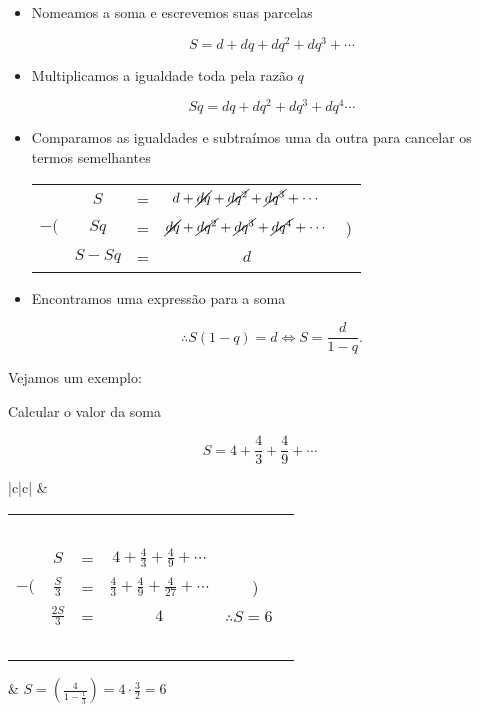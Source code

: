 \begin{itemize}

\item Nomeamos a soma e escrevemos suas parcelas

\[
S=d+dq+dq^2+dq^3+\cdots
\]

\item Multiplicamos a igualdade toda pela razão $q$

\[
Sq=dq+dq^2+dq^3+dq^4\cdots
\]

\item Comparamos as igualdades e subtraímos uma da outra para cancelar os termos semelhantes

\begin{center}
	\begin{tabular}{ccccc}
		\  & $S$ & = & $d+\cancel{dq}+\cancel{dq^2}+\cancel{dq^3}+\cdots$ & \ \\
		$-($ & $Sq$  & = & $\cancel{dq}+\cancel{dq^2}+\cancel{dq^3}+\cancel{dq^4}+\cdots$  & ) \\
		\midrule
		\  & $S-Sq$ & = & $ d $ & \ \\
	\end{tabular}
\end{center}


\item Encontramos uma expressão para a soma

\[
\therefore S(1-q)=d \iff S=\dfrac{d}{1-q}.
\]
\end{itemize}

Vejamos um exemplo:

Calcular o valor da soma

\[
S= 4+\frac43+\frac49+\cdots
\]


\begin{center}
	\begin{tabular}{|c|c|}
		\hline
		 &  \\ \hline
		\begin{tabular}{ccccc}
			&&&& \ \\
			\  & $S$ & = & $4+\frac43+\frac49+\cdots$ & \ \\
			$-($ & $\frac S3$  & = & $\frac43+\frac49+\frac4{27}+\cdots$  & ) \\
			\midrule
			\  & $\frac{2S}3$ & = & $ 4 $ & $\therefore S=6$ \ \\
			&&&& \ \\
		\end{tabular}        &    $S=\left(\frac 4{1-\frac13}\right)=4\cdot \frac32=6$     \\ \hline
	\end{tabular}
\end{center}



